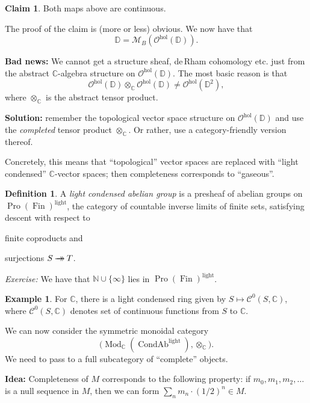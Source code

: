 \documentclass[draft]{amsart}
\newcommand{\NN}{\mathbb{N}}
\newcommand{\DD}{\mathbb{D}}
\newcommand{\CC}{\mathbb{C}}
\renewcommand{\O}{\mathcal{O}}
\newcommand{\cat}[1]{\mathcal{#1}}
\newcommand{\epito}{\mathbin{\to\kern-.8em\to}}
\DeclareMathOperator{\CondAb}{CondAb}
\DeclareMathOperator{\Mod}{Mod}
\DeclareMathOperator{\Pro}{Pro}
\DeclareMathOperator{\Fin}{Fin}
\theoremstyle{definition}
\newtheorem{defn}[thm]{Definition}
\newtheorem{ex}[thm]{Example}
\newtheorem*{claim}{Claim}
\begin{document}
\begin{claim}
Both maps above are continuous.
\end{claim}
The proof of the claim is (more or less) obvious. We now have that
\[
\DD = \cat M_{B}(\O^{\mathrm{hol}}(\DD)).
\]

\textbf{Bad news:} We cannot get a structure sheaf, de\,Rham cohomology etc. just from the abstract $\CC$-algebra structure on $\O^{\mathrm{hol}}(\DD)$.
The most basic reason is that
\[
\O^{\mathrm{hol}}(\DD) \otimes_{\CC} \O^{\mathrm{hol}}(\DD) \neq \O^{\mathrm{hol}}(\DD^2),
\]
where $\otimes_{\CC}$ is the abstract tensor product.

\textbf{Solution:} remember the topological vector space structure on $\O^{\mathrm{hol}}(\DD)$ and use the \emph{completed} tensor product $\otimes_{\CC}$. Or rather, use a category-friendly version thereof.

Concretely, this means that \enquote{topological} vector spaces are replaced with \enquote{light condensed} $\CC$-vector spaces; then completeness corresponds to \enquote{gaseous}.

\begin{defn}
A \emph{light condensed abelian group} is a presheaf of abelian groups on $\Pro(\Fin)^{\mathrm{light}}$, the category of countable inverse limits of finite sets, satisfying descent with respect to 
\begin{enumerate*}[(1)]
\item finite coproducts and
\item surjections $S\epito T$.
\end{enumerate*}

\textit{Exercise:} We have that $\NN\cup\{\infty\}$ lies in $\Pro(\Fin)^{\mathrm{light}}$.
\end{defn}

\begin{ex}
For $\CC$, there is a light condensed ring given by $S\mapsto \cat C^0(S,\CC)$, where $\cat C^0(S,\CC)$ denotes set of continuous functions from $S$ to $\CC$.
\end{ex}

We can now consider the symmetric monoidal category
\[
\bigl(\Mod_{\CC}(\CondAb^{\mathrm{light}}), \otimes_{\CC}).
\]
We need to pass to a full subcategory of \enquote{complete} objects.

\textbf{Idea:} Completeness of $M$ corresponds to the following property: if $m_0, m_1, m_2, \dotsc$ is a null sequence in $M$, then we can form $\sum_n m_n \cdot (1/2)^n \in M$.
\end{document}
